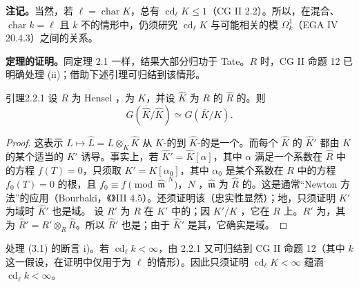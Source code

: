 \textbf{注记。}当然，若 $\ell=\operatorname{char}K$，总有 $\operatorname{cd}_\ell K\leq1$（CG II 2.2）。所以，在混合、$\operatorname{char}k=\ell$ 且 $k$ 不的情形中，仍须研究 $\operatorname{cd}_\ell K$ 与可能相关的模 $\Omega^1_k$（EGA IV 20.4.3）之间的关系。

\textbf{定理的证明。}同定理 2.1 一样，结果大部分归功于 Tate。$R$ 时，CG II 命题 12 已明确处理 (ii)；借助下述引理可归结到该情形。
\begin{SGAresult}{引理}{2.2.1}
设 $R$ 为 Hensel ，为 $K$，并设 $\widehat K$ 为 $R$ 的 $\widehat R$ 的。则
\[
 G(\overline{\widehat K}/\widehat K)\simeq G(\bar K/K).
\]
\end{SGAresult}
\begin{proof}
这表示 $L\mapsto\widehat L=L\otimes_K\widehat K$ 从 $K$-的到 $\widehat K$-的是一个。而每个 $\widehat K$ 的 $\widehat K'$ 都由 $K$ 的某个适当的 $K'$ 诱导。事实上，若 $\widehat K'=\widehat K[\alpha]$，其中 $\alpha$ 满足一个系数在 $\widehat R$ 中的方程 $f(T)=0$，只须取 $K'=K[\alpha_0]$，其中 $\alpha_0$ 是某个系数在 $R$ 中的方程 $f_0(T)=0$ 的根，且 $f_0\equiv f\pmod{\widehat{\mathfrak m}^{,N}}$，$N$ ，$\widehat{\mathfrak m}$ 为 $\widehat R$ 的。这是通常“Newton 方法”的应用（Bourbaki，《》III 4.5）。还须证明该（忠实性显然）；地，只须证明 $K'$ 为域时 $\widehat K'$ 也是域。
设 $R'$ 为 $R$ 在 $K'$ 中的；因 $K'/K$ ，它在 $R$ 上。$R'$ 为，其为 $\widehat R'=R'\otimes_R\widehat R$。所以 $\widehat R'$ 也是；由于 $\widehat K'$ 是其，它确实是域。
\end{proof}
处理 (3.1) 的断言 i)。若 $\operatorname{cd}_\ell k<\infty$，由 2.2.1 又可归结到 CG II 命题 12（其中 $k$ 这一假设，在证明中仅用于为 $\ell$ 的情形）。因此只须证明 $\operatorname{cd}_\ell K<\infty$ 蕴涵 $\operatorname{cd}_\ell k<\infty$。

